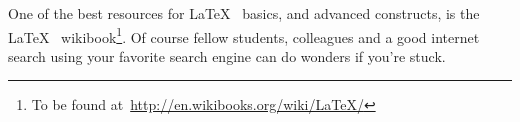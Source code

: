 One of the best resources for \LaTeX~ basics, and advanced constructs, is the \LaTeX~ wikibook\footnote{To be found at~\url{http://en.wikibooks.org/wiki/LaTeX/}}. Of course fellow students, colleagues and a good internet search using your favorite search engine can do wonders if you're stuck. 